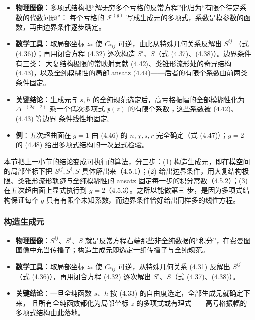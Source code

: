 \begin{keytakeaways}
  \begin{itemize}[leftmargin=1.4em,itemsep=2pt,topsep=2pt]
    \item \textbf{物理图像}：多项式结构把“解无穷多个亏格的反常方程”化归为“有限个待定系数的代数问题”：
          每个亏格的 $\mathcal{F}^{(g)}$ 写成生成元的多项式，系数是模参数的函数，再由边界条件逐步确定。
    \item \textbf{数学工具}：取局部坐标 $z_*$ 使 $C_{*ij}$ 可逆，由此从特殊几何关系反解出 $S^{ij}$
          （式 (4.36)）；再用闭合方程 (4.32) 逐次构造 $S^i$、$S$（式 (4.37)、(4.38)）。边界条件有三类：
          大复结构极限的常映射贡献 (4.42)、类锥形流形处的奇异结构 (4.43)，以及全纯模糊性的局部 ansatz
          (4.44)——后者的有限个系数由前两类条件固定。
    \item \textbf{关键结论}：生成元与 $s,h$ 的全纯规范选定后，高亏格振幅的全部模糊性化为
          $\Delta^{-(2g-2)}$ 乘一个低次多项式 $p(z)$ 的有限个系数；这些系数被 (4.42)、(4.43) 等边界
          条件线性地固定。
    \item \textbf{例}：五次超曲面在 $g=1$ 由 (4.46) 的 $n,\chi,s,r$ 完全确定（式 (4.47)）；$g=2$ 的
          (4.48) 给出多项式结构的一次显式检验。
  \end{itemize}
\end{keytakeaways}

\begin{yizhu}[物理图像]
本节把上一小节的结论变成可执行的算法，分三步：(1) 构造生成元，即在模空间的局部坐标下把
$S^{ij},S^i,S$ 具体解出来（4.5.1）；(2) 给出边界条件，用大复结构极限、类锥形流形轨迹与全纯模糊性的
ansatz 固定每一步的积分常数（4.5.2）；(3) 在五次超曲面上显式执行到 $g=2$（4.5.3）。之所以能做第三
步，是因为多项式结构保证每个 $g$ 只有有限个未知系数，而边界条件恰好给出同样多的线性方程。
\end{yizhu}

\subsubsection{构造生成元}
\label{sec:4.5.1}

\begin{keytakeaways}
  \begin{itemize}[leftmargin=1.4em,itemsep=2pt,topsep=2pt]
    \item \textbf{物理图像}：$S^{ij}$、$S^i$、$S$ 就是反常方程右端那些非全纯数据的“积分”，在费曼图
          图像中充当传播子；构造生成元即选定一组传播子与全纯规范。
    \item \textbf{数学工具}：取局部坐标 $z_*$ 使 $C_{*ij}$ 可逆，从特殊几何关系 (4.31) 反解出 $S^{ij}$
          （式 (4.36)），再用闭合方程 (4.32) 逐次解出 $S^i$、$S$（式 (4.37)、(4.38)）。
    \item \textbf{关键结论}：一旦全纯函数 $s$、$h$ 按 (4.33) 的自由度选定，全部生成元就确定下来，
          且所有全纯函数都化为局部坐标 $z$ 的多项式或有理式——高亏格振幅的多项式结构由此落地。
  \end{itemize}
\end{keytakeaways}

